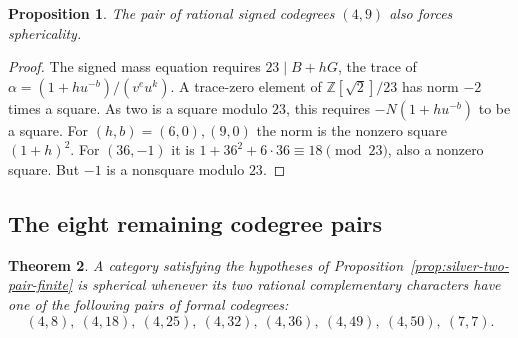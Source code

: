 \documentclass[11pt,reqno]{amsart}
\newtheorem{theorem}{Theorem}[section]
\newtheorem{proposition}[theorem]{Proposition}
\theoremstyle{remark}\newtheorem{remark}[theorem]{Remark}
\numberwithin{equation}{section}
\begin{document}
\begin{proposition}\label{prop:silver-four-nine}
The pair of rational signed codegrees $(4,9)$ also forces sphericality.
\end{proposition}
\begin{proof}
The signed mass equation requires $23\mid B+hG$, the trace of
$\alpha=(1+h u^{-b})/(v^e u^k)$. A trace-zero element of
$\mathbb Z[\sqrt2]/23$ has norm $-2$ times a square. As two is
a square modulo $23$, this requires $-N(1+h u^{-b})$ to be a
square. For $(h,b)=(6,0),(9,0)$ the norm is the nonzero square
$(1+h)^2$. For $(36,-1)$ it is $1+36^2+6\cdot36\equiv18\pmod{23}$,
also a nonzero square. But $-1$ is a nonsquare modulo $23$.
\end{proof}

\subsection{The eight remaining codegree pairs}
\begin{theorem}\label{thm:silver-large-pairs}
A category satisfying the hypotheses of
Proposition~\ref{prop:silver-two-pair-finite} is spherical whenever
its two rational complementary characters have one of the following
pairs of formal codegrees:
\[
   (4,8),\ (4,18),\ (4,25),\ (4,32),\ (4,36),\ (4,49),\ (4,50),\ (7,7).
\]
\end{theorem}
\end{document}
